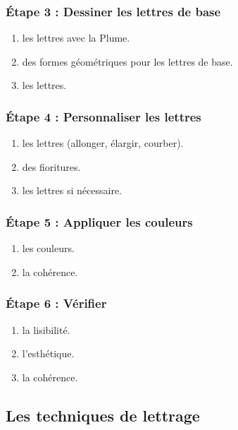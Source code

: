 \subsubsection{Étape 3 : Dessiner les lettres de base}

\begin{enumerate}
    \item {} les lettres avec la Plume.
    \item {} des formes géométriques pour les lettres de base.
    \item {} les lettres.
\end{enumerate}

\subsubsection{Étape 4 : Personnaliser les lettres}

\begin{enumerate}
    \item {} les lettres (allonger, élargir, courber).
    \item {} des fioritures.
    \item {} les lettres si nécessaire.
\end{enumerate}

\subsubsection{Étape 5 : Appliquer les couleurs}

\begin{enumerate}
    \item {} les couleurs.
    \item {} la cohérence.
\end{enumerate}

\subsubsection{Étape 6 : Vérifier}

\begin{enumerate}
    \item {} la lisibilité.
    \item {} l'esthétique.
    \item {} la cohérence.
\end{enumerate}

\subsection{Les techniques de lettrage}

